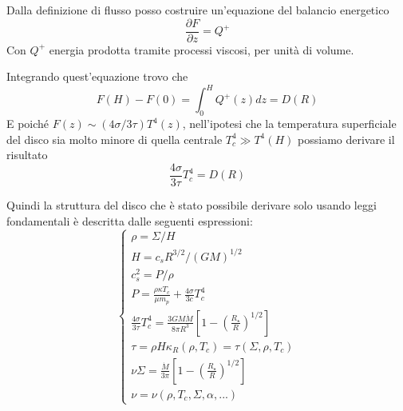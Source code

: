 \documentclass[a4paperbi]{article}
\begin{document}
	Dalla definizione di flusso posso costruire un'equazione del balancio energetico
	\begin{equation}
		\frac{\partial F}{\partial z}=Q^+
	\end{equation}
	Con $Q^+$ energia prodotta tramite processi viscosi, per unità di volume.
	
	Integrando quest'equazione trovo che
	\begin{equation}
		F(H)-F(0)=\int_0^HQ^+(z)dz=D(R)
	\end{equation}
	E poiché $F(z)\sim(4\sigma/3\tau)T^4(z)$, nell'ipotesi che la temperatura superficiale del disco sia molto minore di quella centrale $T_c^4\gg T^4(H)$
	possiamo derivare il risultato
	\begin{equation}
		\frac{4\sigma}{3\tau}T^4_c=D(R)
	\end{equation}
	
	Quindi la struttura del disco che è stato possibile derivare solo usando leggi fondamentali è descritta dalle seguenti espressioni:
	\begin{equation}
	\begin{cases}
		\rho=\Sigma/H\\
		H=c_sR^{3/2}/(GM)^{1/2}\\
		c_s^2=P/\rho\\
		P=\frac{\rho\kappa T_c}{\mu m_p}+\frac{4\sigma}{3c}T_c^4\\
		\frac{4\sigma}{3\tau}T^4_c=\frac{3GM\dot{M}}{8\pi R^3}\left[1-\left(\frac{R_{\star}}{R}\right)^{1/2}\right]\\
		\tau=\rho H\kappa_R(\rho,T_c)=\tau(\Sigma,\rho,T_c)\\
		\nu\Sigma=\frac{\dot{M}}{3\pi}\left[1-\left(\frac{R_{\star}}{R}\right)^{1/2}\right]\\
		\nu=\nu(\rho,T_c,\Sigma,\alpha,...)		
	\end{cases}
	\end{equation}
		
\end{document}

